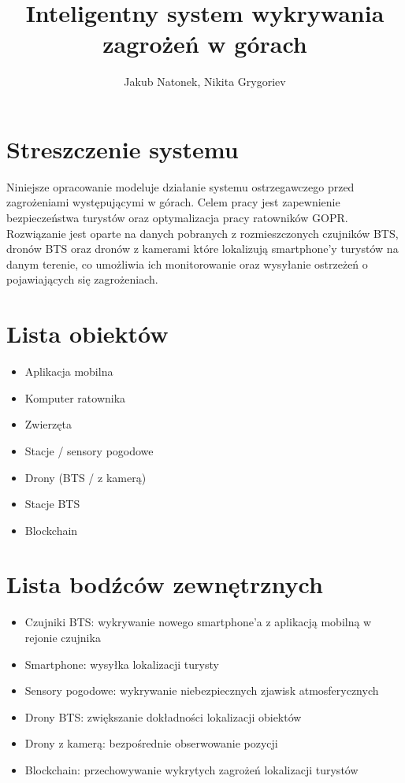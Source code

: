 \documentclass{article}
\title{Inteligentny system wykrywania zagrożeń w górach} %
\author{Jakub Natonek, Nikita Grygoriev} %
\begin{document}
\maketitle 

\tableofcontents
\newpage

\section{Streszczenie systemu} 
Niniejsze opracowanie modeluje działanie systemu ostrzegawczego przed zagrożeniami występującymi w górach.
Celem pracy jest zapewnienie bezpieczeństwa turystów oraz optymalizacja pracy ratowników GOPR. Rozwiązanie jest oparte na danych pobranych z rozmieszczonych czujników BTS, dronów BTS oraz dronów z kamerami które lokalizują smartphone'y turystów na danym terenie, co umożliwia ich monitorowanie oraz wysyłanie ostrzeżeń o pojawiających się zagrożeniach.

\section{Lista obiektów}
\begin{itemize}
  \item Aplikacja mobilna
  \item Komputer ratownika
  \item Zwierzęta
  \item Stacje / sensory pogodowe
  \item Drony (BTS / z kamerą)
  \item Stacje BTS
  \item Blockchain

  
\end{itemize}
\section{Lista bodźców zewnętrznych}
\begin{itemize}
  \item Czujniki BTS: wykrywanie nowego smartphone'a z aplikacją mobilną w rejonie czujnika 
  \item Smartphone: wysyłka lokalizacji turysty
  \item Sensory pogodowe: wykrywanie niebezpiecznych zjawisk atmosferycznych
  \item Drony BTS: zwiększanie dokładności lokalizacji obiektów
  \item Drony z kamerą: bezpośrednie obserwowanie pozycji
  \item Blockchain: przechowywanie wykrytych zagrożeń lokalizacji turystów
\end{itemize}
\clearpage
\end{document}
